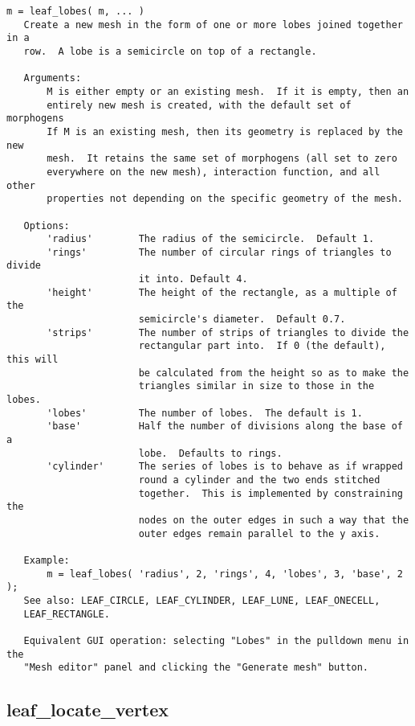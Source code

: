 \begin{verbatim}
m = leaf_lobes( m, ... )
   Create a new mesh in the form of one or more lobes joined together in a
   row.  A lobe is a semicircle on top of a rectangle.

   Arguments:
       M is either empty or an existing mesh.  If it is empty, then an
       entirely new mesh is created, with the default set of morphogens
       If M is an existing mesh, then its geometry is replaced by the new
       mesh.  It retains the same set of morphogens (all set to zero
       everywhere on the new mesh), interaction function, and all other
       properties not depending on the specific geometry of the mesh.

   Options:
       'radius'        The radius of the semicircle.  Default 1.
       'rings'         The number of circular rings of triangles to divide
                       it into. Default 4.
       'height'        The height of the rectangle, as a multiple of the
                       semicircle's diameter.  Default 0.7.
       'strips'        The number of strips of triangles to divide the
                       rectangular part into.  If 0 (the default), this will
                       be calculated from the height so as to make the
                       triangles similar in size to those in the lobes.
       'lobes'         The number of lobes.  The default is 1.
       'base'          Half the number of divisions along the base of a
                       lobe.  Defaults to rings.
       'cylinder'      The series of lobes is to behave as if wrapped
                       round a cylinder and the two ends stitched
                       together.  This is implemented by constraining the
                       nodes on the outer edges in such a way that the
                       outer edges remain parallel to the y axis.

   Example:
       m = leaf_lobes( 'radius', 2, 'rings', 4, 'lobes', 3, 'base', 2 );
   See also: LEAF_CIRCLE, LEAF_CYLINDER, LEAF_LUNE, LEAF_ONECELL,
   LEAF_RECTANGLE.

   Equivalent GUI operation: selecting "Lobes" in the pulldown menu in the
   "Mesh editor" panel and clicking the "Generate mesh" button.
\end{verbatim}

\subsection{leaf\_locate\_vertex}\label{section-leaf-locate-vertex}

